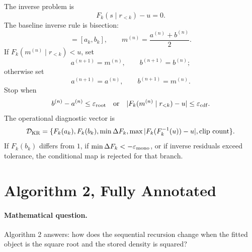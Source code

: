\documentclass[11pt]{article}
\numberwithin{equation}{section}
\begin{document}
The inverse problem is
\begin{equation}
    F_k(s\mid r_{<k})-u=0.
    \label{eq:p24-p23-krops5}
\end{equation}
The baseline inverse rule is bisection:
\begin{equation}
    [a^{(0)},b^{(0)}]=[a_k,b_k],
    \qquad
    m^{(n)}=\frac{a^{(n)}+b^{(n)}}2.
    \label{eq:p24-p23-krops6}
\end{equation}
If \(F_k(m^{(n)}\mid r_{<k})<u\), set
\begin{equation}
    a^{(n+1)}=m^{(n)},\qquad b^{(n+1)}=b^{(n)};
    \label{eq:p24-p23-krops7}
\end{equation}
otherwise set
\begin{equation}
    a^{(n+1)}=a^{(n)},\qquad b^{(n+1)}=m^{(n)}.
    \label{eq:p24-p23-krops8}
\end{equation}
Stop when
\begin{equation}
    b^{(n)}-a^{(n)}\le \varepsilon_{\rm root}
    \quad\text{or}\quad
    |F_k(m^{(n)}\mid r_{<k})-u|\le \varepsilon_{\rm cdf}.
    \label{eq:p24-p23-krops9}
\end{equation}
The operational diagnostic vector is
\begin{equation}
    \mathcal D_{\rm KR}
    =
    \{F_k(a_k),F_k(b_k),\min\Delta F_k,
      \max|F_k(F_k^{-1}(u))-u|,\text{clip count}\}.
    \label{eq:p24-p23-krops10}
\end{equation}
If \(F_k(b_k)\) differs from \(1\), if \(\min\Delta F_k<-\varepsilon_{\rm mono}\),
or if inverse residuals exceed tolerance, the conditional map is rejected for
that branch.

\begin{center}
\end{center}

\section{Algorithm 2, Fully Annotated}

\paragraph{Mathematical question.}
Algorithm 2 answers: how does the sequential recursion change when the fitted
object is the square root and the stored density is squared?
\end{document}
